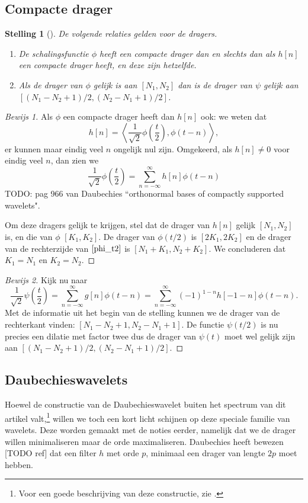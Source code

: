 \documentclass[11pt]{report}
\theoremstyle{plain}
\newtheorem{stelling}{Stelling}
\theoremstyle{definition}
\theoremstyle{remark}
\begin{document}
\subsection{Compacte drager} 
\begin{stelling}[{\cite[P7.2]{mallat}}]
  De volgende relaties gelden voor de dragers.
  \begin{enumerate}
    \item De schalingsfunctie $\phi$ heeft een compacte drager dan en slechts dan als $h[n]$ een compacte drager heeft, en deze zijn hetzelfde.
    \item Als de drager van $\phi$ gelijk is aan $[N_1,N_2]$ dan is de drager van $\psi$ gelijk aan $[(N_1 - N_2 + 1)/2, (N_2 - N_1 + 1)/2]$.
  \end{enumerate}
\end{stelling}
\begin{proof}[Bewijs 1] Als $\phi$ een compacte drager heeft dan $h[n]$ ook: we weten dat
\[
  h[n] = \left\langle \frac{1}{\sqrt{2}} \phi\left(\frac{t}{2}\right), \phi(t-n) \right\rangle,
\]
er kunnen maar eindig veel $n$ ongelijk nul zijn. Omgekeerd, als $h[n] \not= 0$ voor eindig veel $n$, dan zien we
\begin{equation}
\label{phi_t2}
	\frac{1}{\sqrt{2}} \phi\left(\frac{t}{2}\right) = \sum_{n=-\infty}^\infty h[n] \phi(t-n)
\end{equation}
 TODO: pag 966 van Daubechies ``orthonormal bases of compactly supported wavelets".

Om deze dragers gelijk te krijgen, stel dat de drager van $h[n]$ gelijk $[N_1,N_2]$ is, en die van $\phi$ $[K_1, K_2]$. De drager van $\phi(t/2)$ is $[2K_1, 2K_2]$ en de drager van de rechterzijde van $\ref{phi_t2}$ is $[N_1 + K_1, N_2 + K_2]$. We concluderen dat $K_1 = N_1$ en $K_2 = N_2$.
\end{proof}
\begin{proof}[Bewijs 2]
Kijk nu naar
\[
\frac{1}{\sqrt{2}} \psi\left(\frac{t}{2}\right) = \sum_{n=-\infty}^{\infty} g[n] \phi(t-n) = \sum_{n=-\infty}^{\infty} (-1)^{1-n}h[-1-n] \phi(t-n).
\]
Met de informatie uit het begin van de stelling kunnen we de drager van de rechterkant vinden: $[N_1 - N_2 + 1, N_2 - N_1 + 1]$. De functie $\psi(t/2)$ is nu precies een dilatie met factor twee dus de drager van $\psi(t)$ moet wel gelijk zijn aan $[(N_1 - N_2 + 1)/2, (N_2 - N_1 + 1)/2]$.
\end{proof}

\subsection{Daubechieswavelets}
Hoewel de constructie van de Daubechieswavelet buiten het spectrum van dit artikel valt,\footnote{Voor een goede beschrijving van deze constructie, zie \cite{mallat}.} willen we toch een kort licht schijnen op deze speciale familie van wavelets. Deze worden gemaakt met de noties eerder, namelijk dat we de drager willen minimaliseren maar de orde maximaliseren. Daubechies heeft bewezen [TODO ref] dat een filter $h$ met orde $p$, minimaal een drager van lengte $2p$ moet hebben. 
\end{document}
